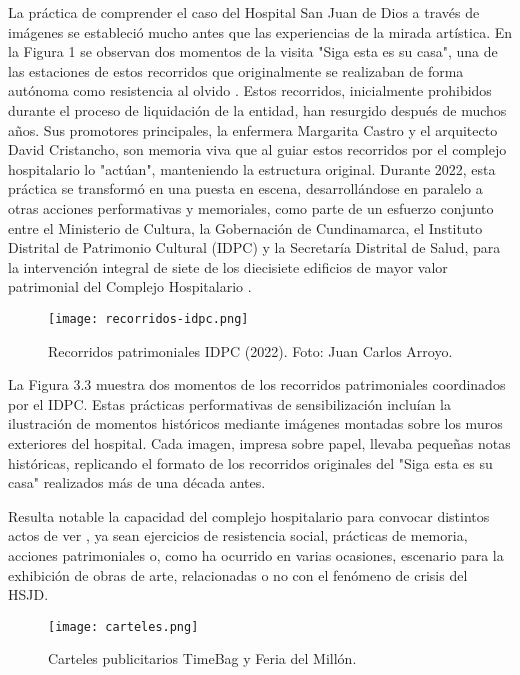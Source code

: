 La práctica de comprender el caso del Hospital San Juan de Dios a través de imágenes se estableció mucho antes que las experiencias de la mirada artística. En la Figura 1 se observan dos momentos de la visita "Siga esta es su casa", una de las estaciones de estos recorridos que originalmente se realizaban de forma autónoma como resistencia al olvido \parencite{Gongora2013}. Estos recorridos, inicialmente prohibidos durante el proceso de liquidación de la entidad, han resurgido después de muchos años. Sus promotores principales, la enfermera Margarita Castro y el arquitecto David Cristancho, son memoria viva que al guiar estos recorridos por el complejo hospitalario lo "actúan", manteniendo la estructura original. Durante 2022, esta práctica se transformó en una puesta en escena, desarrollándose en paralelo a otras acciones performativas y memoriales, como parte de un esfuerzo conjunto entre el Ministerio de Cultura, la Gobernación de Cundinamarca, el Instituto Distrital de Patrimonio Cultural (IDPC) y la Secretaría Distrital de Salud, para la intervención integral de siete de los diecisiete edificios de mayor valor patrimonial del Complejo Hospitalario \parencite{IDPCSanJuanDeDios}.
    
\begin{figure}[ht]
    \centering
    \texttt{[image: recorridos-idpc.png]}
    \caption{Recorridos patrimoniales IDPC (2022). Foto: Juan Carlos Arroyo.}
\end{figure}

La Figura 3.3 muestra dos momentos de los recorridos patrimoniales coordinados por el IDPC. Estas prácticas performativas de sensibilización \parencite{Guasch2011} incluían la ilustración de momentos históricos mediante imágenes montadas sobre los muros exteriores del hospital. Cada imagen, impresa sobre papel, llevaba pequeñas notas históricas, replicando el formato de los recorridos originales del "Siga esta es su casa" realizados más de una década antes.

Resulta notable la capacidad del complejo hospitalario para convocar distintos actos de ver \parencite{Abril2007}, ya sean ejercicios de resistencia social, prácticas de memoria, acciones patrimoniales o, como ha ocurrido en varias ocasiones, escenario para la exhibición de obras de arte, relacionadas o no con el fenómeno de crisis del HSJD.

\begin{figure}[ht]
    \centering
    \texttt{[image: carteles.png]}
    \caption{Carteles publicitarios TimeBag y Feria del Millón.}
\end{figure}

